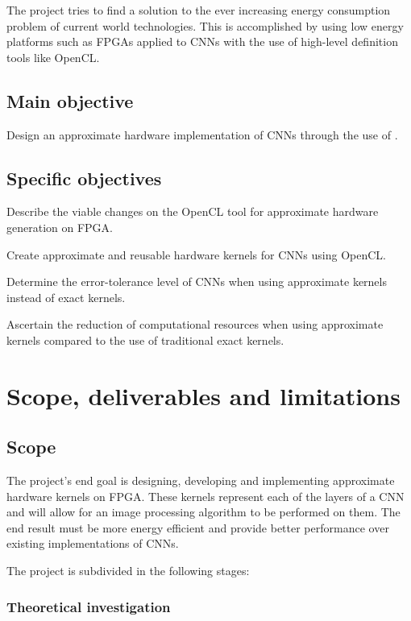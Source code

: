 The project tries to find a solution to the ever increasing energy consumption problem
of current world technologies. This is accomplished by using low energy platforms such as
FPGAs applied to CNNs with the use of high-level definition tools like OpenCL.

\subsection{Main objective}

Design an approximate hardware implementation of CNNs through the 
use of \intelOCL.

\subsection{Specific objectives}

\begin{compactitem}
    \item Describe the viable changes on the OpenCL tool for approximate hardware generation on FPGA.
    \item Create approximate and reusable hardware kernels for CNNs using OpenCL.
    \item Determine the error-tolerance level of CNNs when using approximate kernels instead of exact kernels.
    \item Ascertain the reduction of computational resources when using approximate kernels compared to the use of traditional exact kernels.
\end{compactitem}

\section{Scope, deliverables and limitations}

\subsection{Scope}

The project's end goal is designing, developing and implementing approximate hardware kernels on FPGA.
These kernels represent each of the layers of a CNN and will allow for an image processing algorithm to be
performed on them. The end result must be more energy efficient and provide better performance over existing
implementations of CNNs.

The project is subdivided in the following stages:

\subsubsection{Theoretical investigation}

